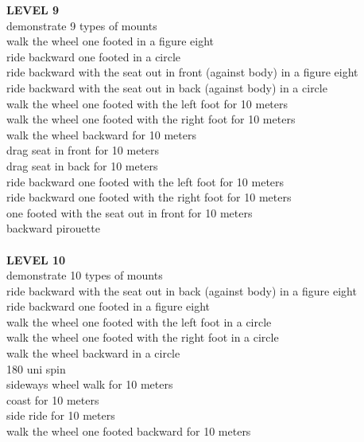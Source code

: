 \begin{multicols}{2}
\textbf{LEVEL 9}\\
demonstrate 9 types of mounts\\
walk the wheel one footed in a figure eight\\
ride backward one footed in a circle\\
ride backward with the seat out in front (against body) in a figure eight\\
ride backward with the seat out in back (against body) in a circle\\
walk the wheel one footed with the left foot for 10 meters\\
walk the wheel one footed with the right foot for 10 meters\\
walk the wheel backward for 10 meters\\
drag seat in front for 10 meters\\
drag seat in back for 10 meters\\
ride backward one footed with the left foot for 10 meters\\
ride backward one footed with the right foot for 10 meters\\
one footed with the seat out in front for 10 meters\\
backward pirouette\\\\
\textbf{LEVEL 10}\\
demonstrate 10 types of mounts\\
ride backward with the seat out in back (against body) in a figure eight\\
ride backward one footed in a figure eight\\
walk the wheel one footed with the left foot in a circle\\
walk the wheel one footed with the right foot in a circle\\
walk the wheel backward in a circle\\
180 uni spin\\
sideways wheel walk for 10 meters\\
coast for 10 meters\\
side ride for 10 meters\\
walk the wheel one footed backward for 10 meters\\
\end{multicols}
\endgroup